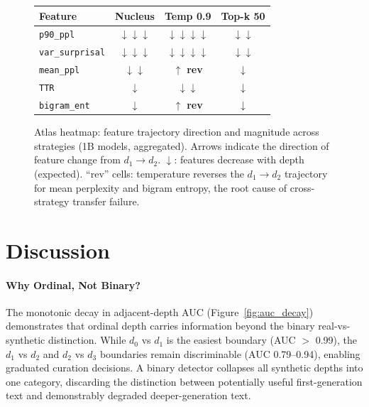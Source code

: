 \documentclass[11pt,a4paper]{article}
\begin{document}
\begin{figure}[t]
\centering
\small
\begin{tabular}{l|ccc}
\textbf{Feature} & \textbf{Nucleus} & \textbf{Temp 0.9} & \textbf{Top-k 50} \\
\hline
\texttt{p90\_ppl} & $\downarrow\downarrow\downarrow$ & $\downarrow\downarrow\downarrow\downarrow$ & $\downarrow\downarrow$ \\
\texttt{var\_surprisal} & $\downarrow\downarrow\downarrow$ & $\downarrow\downarrow\downarrow\downarrow$ & $\downarrow\downarrow$ \\
\texttt{mean\_ppl} & $\downarrow\downarrow$ & $\uparrow$ \textbf{rev} & $\downarrow$ \\
\texttt{TTR} & $\downarrow$ & $\downarrow\downarrow$ & $\downarrow$ \\
\texttt{bigram\_ent} & $\downarrow$ & $\uparrow$ \textbf{rev} & $\downarrow$ \\
\end{tabular}
\caption{Atlas heatmap: feature trajectory direction and magnitude across strategies (1B models, aggregated). Arrows indicate the direction of feature change from $d_1 \to d_2$. $\downarrow$: features decrease with depth (expected). ``rev'' cells: temperature reverses the $d_1 \to d_2$ trajectory for mean perplexity and bigram entropy, the root cause of cross-strategy transfer failure.}
\label{fig:atlas_heatmap}
\end{figure}

\section{Discussion}

\paragraph{Why Ordinal, Not Binary?}
The monotonic decay in adjacent-depth AUC (Figure~\ref{fig:auc_decay}) demonstrates that ordinal depth carries information beyond the binary real-vs-synthetic distinction. While $d_0$ vs $d_1$ is the easiest boundary (AUC $>$ 0.99), the $d_1$ vs $d_2$ and $d_2$ vs $d_3$ boundaries remain discriminable (AUC 0.79--0.94), enabling graduated curation decisions. A binary detector collapses all synthetic depths into one category, discarding the distinction between potentially useful first-generation text and demonstrably degraded deeper-generation text.
\end{document}
